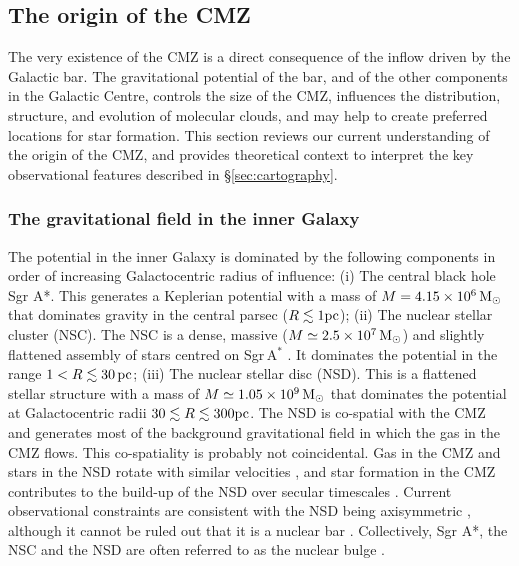 

\subsection{The origin of the CMZ} \label{sec:generaldynamics}

The very existence of the CMZ is a direct consequence of the inflow driven by the Galactic bar. The gravitational potential of the bar, and of the other components in the Galactic Centre, controls the size of the CMZ, influences the distribution, structure, and evolution of molecular clouds, and may help to create preferred locations for star formation. 
This section reviews our current understanding of the origin of the CMZ, and provides theoretical context to interpret the key observational features described in \S\ref{sec:cartography}. 

\subsubsection{The gravitational field in the inner Galaxy} \label{sec:potential}

The potential in the inner Galaxy is dominated by the following components in order of increasing Galactocentric radius of influence: (i) The central black hole Sgr A*. This generates a Keplerian potential with a mass of $M=4.15 \times 10^6\,\mbox{M$_\odot$}$ \citep{Ghez2008, Gillessen2009, GravityCollaboration2019} that dominates gravity in the central parsec ($R\lesssim 1\mbox{${\rm pc}$}$); (ii) The nuclear stellar cluster (NSC). The NSC is a dense, massive ($M \simeq 2.5 \times 10^7\, \mbox{M$_\odot$}$) and slightly flattened assembly of stars centred on Sgr\,A$^{*}$ \citep{Genzel2010,Schodel2014b,Feldmeier-Krause2017}. It dominates the potential in the range $1<R\lesssim30\,\mbox{${\rm pc}$}$; (iii) The nuclear stellar disc (NSD). This is a flattened stellar structure with a mass of $M\simeq 1.05 \times 10^9\, \mbox{M$_\odot$}$ \citep{Launhardt2002,Sormani2020a, Sormani2021} that dominates the potential at Galactocentric radii $30 \lesssim R \lesssim 300\mbox{${\rm pc}$}$. The NSD is co-spatial with the CMZ and generates most of the background gravitational field in which the gas in the CMZ flows. This co-spatiality is probably not coincidental. Gas in the CMZ and stars in the NSD rotate with similar velocities \citep{Schonrich2015,Schultheis2021}, and star formation in the CMZ contributes to the build-up of the NSD over secular timescales \citep{Baba2020}. Current observational constraints are consistent with the NSD being axisymmetric \citep{Gerhard2012,Valenti2016,Sormani2021}, although it cannot be ruled out that it is a nuclear bar \citep{Alard2001,Rodriguez-Fernandez2008}. Collectively, Sgr A*, the NSC and the NSD are often referred to as the nuclear bulge \citep{Launhardt2002}.

